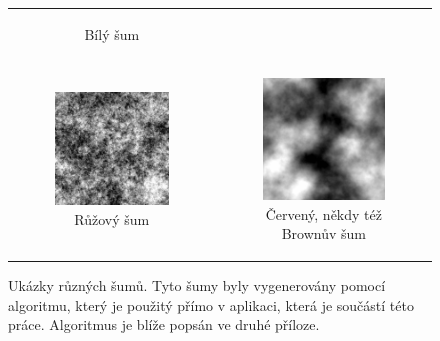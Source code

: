 \begin{figure}[h!]
\begin{tabular}{cc}
\begin{subfigure}{0.45\textwidth}
  \caption{Bílý šum} 
\end{subfigure}\\
\begin{subfigure}{0.45\textwidth}
  \centering
  \includegraphics[width=.8\linewidth]{img/pink_noise}
  \caption{Růžový šum} 
\end{subfigure}&
\begin{subfigure}{0.45\textwidth}
  \centering
  \includegraphics[width=.8\linewidth]{img/brown_noise}
  \caption{Červený, někdy též Brownův šum} 
\end{subfigure}%
\end{tabular} 
\caption{Ukázky různých šumů. Tyto šumy byly vygenerovány pomocí algoritmu, který je použitý přímo v aplikaci, která je součástí této práce. Algoritmus je blíže popsán ve druhé příloze.} 
\label{obr:noise:example} 
 
\end{figure}
